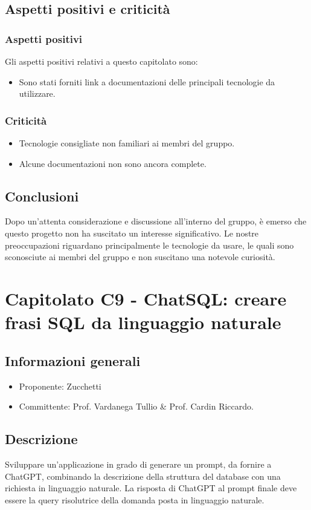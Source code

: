 \documentclass[12pt]{report}
\begin{document}
\section{Aspetti positivi e criticità}

\subsection{Aspetti positivi}
Gli aspetti positivi relativi a questo capitolato sono:
\begin{itemize}
    \item Sono stati forniti link a documentazioni delle principali tecnologie da utilizzare.
\end{itemize}
\subsection{Criticità}
\begin{itemize}
    \item Tecnologie consigliate non familiari ai membri del gruppo.
    \item Alcune documentazioni non sono ancora complete.
\end{itemize}
\section{Conclusioni}
Dopo un'attenta considerazione e discussione all'interno del gruppo, è emerso che questo progetto non ha suscitato un interesse significativo. Le nostre preoccupazioni riguardano principalmente le tecnologie da usare, le quali sono sconosciute ai membri del gruppo e non suscitano una notevole curiosità.

\chapter{Capitolato C9 - ChatSQL: creare frasi SQL da linguaggio naturale}\label{chapter:9}
\section{Informazioni generali}
\begin{itemize}
    \item Proponente: Zucchetti
    \item Committente: Prof. Vardanega Tullio \& Prof. Cardin Riccardo.
\end{itemize}

\section{Descrizione}
Sviluppare un'applicazione in grado di generare un prompt, da fornire a ChatGPT, combinando la descrizione della struttura del database con una richiesta in linguaggio naturale. La risposta di ChatGPT al prompt finale deve essere la query risolutrice della domanda posta in linguaggio naturale.
\end{document}
